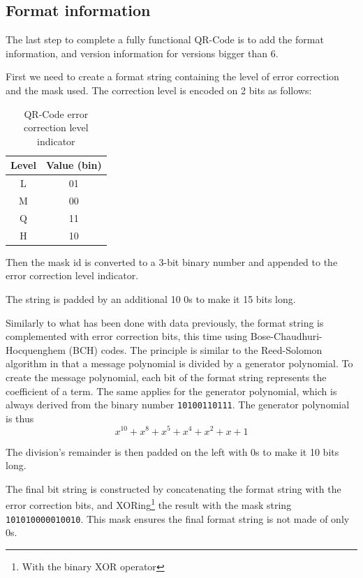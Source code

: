 \subsection{Format information}
\label{ssec:qr_fmt_info}

The last step to complete a fully functional QR-Code is to add the format information, and version information for versions bigger than 6.

First we need to create a format string containing the level of error correction and the mask used. The correction level is encoded on 2 bits as follows:

\begin{table}[H]
  \centering
  \begin{tabu}{|c|c|}
    \hline
    Level & Value (bin) \\
    \hline
    L & 01 \\
    \hline
    M & 00 \\
    \hline
    Q & 11 \\
    \hline
    H & 10 \\
    \hline
  \end{tabu}
  \caption{QR-Code error correction level indicator}
  \label{tab:qr_ec_ind}
\end{table}

Then the mask id is converted to a 3-bit binary number and appended to the error correction level indicator.

The string is padded by an additional 10 0s to make it 15 bits long.

Similarly to what has been done with data previously, the format string is complemented with error correction bits, this time using Bose-Chaudhuri-Hocquenghem (BCH) codes.
The principle is similar to the Reed-Solomon algorithm in that a message polynomial is divided by a generator polynomial. To create the message polynomial, each bit of the format string represents the coefficient of a term. The same applies for the generator polynomial, which is always derived from the binary number \texttt{10100110111}.
The generator polynomial is thus \[
  x^{10} + x^8 + x^5 + x^4 + x^2 + x + 1
\]

The division's remainder is then padded on the left with 0s to make it 10 bits long.

The final bit string is constructed by concatenating the format string with the error correction bits, and XORing\footnote{With the binary XOR operator} the result with the mask string \texttt{101010000010010}. This mask ensures the final format string is not made of only 0s.


